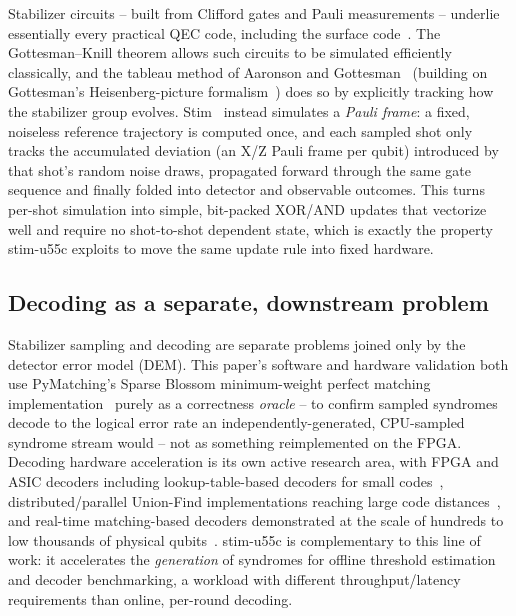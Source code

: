 \documentclass[pdflatex,sn-basic]{sn-jnl}
\begin{document}
Stabilizer circuits -- built from Clifford gates and Pauli measurements -- underlie essentially every practical QEC code, including the surface code~\cite{kitaev2003faulttolerant,dennis2002topological,fowler2012surface}. The Gottesman--Knill theorem allows such circuits to be simulated efficiently classically, and the tableau method of Aaronson and Gottesman~\cite{aaronson2004chp} (building on Gottesman's Heisenberg-picture formalism~\cite{gottesman1998heisenberg}) does so by explicitly tracking how the stabilizer group evolves. Stim~\cite{gidney2021stim} instead simulates a \emph{Pauli frame}: a fixed, noiseless reference trajectory is computed once, and each sampled shot only tracks the accumulated deviation (an X/Z Pauli frame per qubit) introduced by that shot's random noise draws, propagated forward through the same gate sequence and finally folded into detector and observable outcomes. This turns per-shot simulation into simple, bit-packed XOR/AND updates that vectorize well and require no shot-to-shot dependent state, which is exactly the property stim-u55c exploits to move the same update rule into fixed hardware.

\subsection{Decoding as a separate, downstream problem}

Stabilizer sampling and decoding are separate problems joined only by the detector error model (DEM). This paper's software and hardware validation both use PyMatching's Sparse Blossom minimum-weight perfect matching implementation~\cite{higgott2023sparseblossom} purely as a correctness \emph{oracle} -- to confirm sampled syndromes decode to the logical error rate an independently-generated, CPU-sampled syndrome stream would -- not as something reimplemented on the FPGA. Decoding hardware acceleration is its own active research area, with FPGA and ASIC decoders including lookup-table-based decoders for small codes~\cite{das2022lilliput}, distributed/parallel Union-Find implementations reaching large code distances~\cite{liyanage2023fpgadecoder,delfosse2021unionfind}, and real-time matching-based decoders demonstrated at the scale of hundreds to low thousands of physical qubits~\cite{barber2023realtime}. stim-u55c is complementary to this line of work: it accelerates the \emph{generation} of syndromes for offline threshold estimation and decoder benchmarking, a workload with different throughput/latency requirements than online, per-round decoding.
\end{document}
